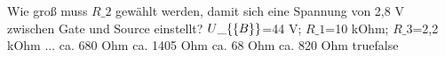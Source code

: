     {Wie groß muss $R\_2$ gewählt werden, damit sich eine Spannung von 2,8 V zwischen Gate und Source einstellt? $U\_\{\textrm\{B\}\}$=44 V; $R\_1$=10 kOhm; $R\_3$=2,2 kOhm ...}
    {ca. 680 Ohm}
    {ca. 1405 Ohm}
    {ca. 68 Ohm}
    {ca. 820 Ohm}
    {true}{false}